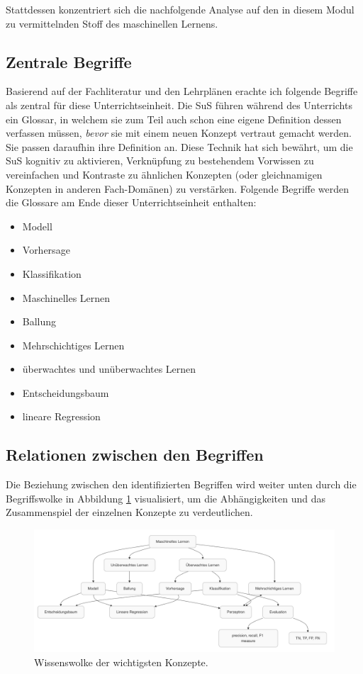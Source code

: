 \documentclass[twocolumn]{article}
\begin{document}
Stattdessen konzentriert sich die nachfolgende Analyse auf den in diesem Modul zu vermittelnden Stoff des maschinellen Lernens.

\subsection{Zentrale Begriffe}

Basierend auf der Fachliteratur und den Lehrplänen erachte ich folgende Begriffe als zentral für diese Unterrichtseinheit. Die SuS führen während des Unterrichts ein Glossar, in welchem sie zum Teil auch schon eine eigene Definition dessen verfassen müssen, \textit{bevor} sie mit einem neuen Konzept vertraut gemacht werden. Sie passen daraufhin ihre Definition an. Diese Technik hat sich bewährt, um die SuS kognitiv zu aktivieren, Verknüpfung zu bestehendem Vorwissen zu vereinfachen und Kontraste zu ähnlichen Konzepten (oder gleichnamigen Konzepten in anderen Fach-Domänen) zu verstärken. Folgende Begriffe werden die Glossare am Ende dieser Unterrichtseinheit enthalten:

\begin{itemize}[noitemsep]
    \item Modell
    \item Vorhersage
    \item Klassifikation
    \item Maschinelles Lernen
    \item Ballung
    \item Mehrschichtiges Lernen
    \item überwachtes und unüberwachtes Lernen
    \item Entscheidungsbaum
    \item lineare Regression
\end{itemize}

\subsection{Relationen zwischen den Begriffen}

Die Beziehung zwischen den identifizierten Begriffen wird weiter unten durch die Begriffswolke in Abbildung \ref{fig:conceptmap} visualisiert, um die Abhängigkeiten und das Zusammenspiel der einzelnen Konzepte zu verdeutlichen.


\begin{figure}[t]
    \centering
    \includegraphics[width=\textwidth]{mindmap}
    \caption{Wissenswolke der wichtigsten Konzepte. }
    \label{fig:conceptmap}
\end{figure}
\end{document}
